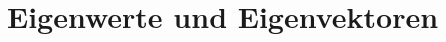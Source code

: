 %
%
%
\chapter{Eigenwerte und Eigenvektoren
\label{buch:chapter:eigenwerte-und-eigenvektoren}}
\rhead{}







